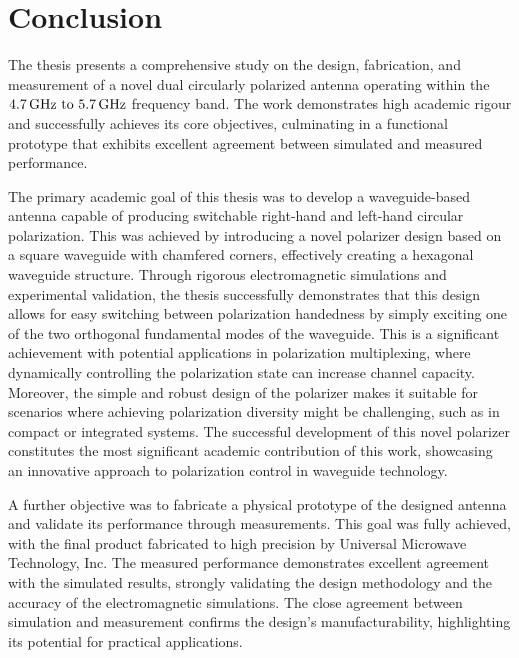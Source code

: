 \documentclass[11pt,a4paper,twoside,openany]{report}
\begin{document}
\chapter*{Conclusion}
\label{chapter:conclusion}

The thesis presents a comprehensive study on the design, fabrication, and measurement of a novel dual circularly polarized antenna operating within the $\frequencyrange$ frequency band. The work demonstrates high academic rigour and successfully achieves its core objectives, culminating in a functional prototype that exhibits excellent agreement between simulated and measured performance.

The primary academic goal of this thesis was to develop a waveguide-based antenna capable of producing switchable right-hand and left-hand circular polarization. This was achieved by introducing a novel polarizer design based on a square waveguide with chamfered corners, effectively creating a hexagonal waveguide structure. Through rigorous electromagnetic simulations and experimental validation, the thesis successfully demonstrates that this design allows for easy switching between polarization handedness by simply exciting one of the two orthogonal fundamental modes of the waveguide. This is a significant achievement with potential applications in polarization multiplexing, where dynamically controlling the polarization state can increase channel capacity. Moreover, the simple and robust design of the polarizer makes it suitable for scenarios where achieving polarization diversity might be challenging, such as in compact or integrated systems. The successful development of this novel polarizer constitutes the most significant academic contribution of this work, showcasing an innovative approach to polarization control in waveguide technology.

A further objective was to fabricate a physical prototype of the designed antenna and validate its performance through measurements. This goal was fully achieved, with the final product fabricated to high precision by Universal Microwave Technology, Inc. The measured performance demonstrates excellent agreement with the simulated results, strongly validating the design methodology and the accuracy of the electromagnetic simulations. The close agreement between simulation and measurement confirms the design's manufacturability, highlighting its potential for practical applications.
\end{document}
